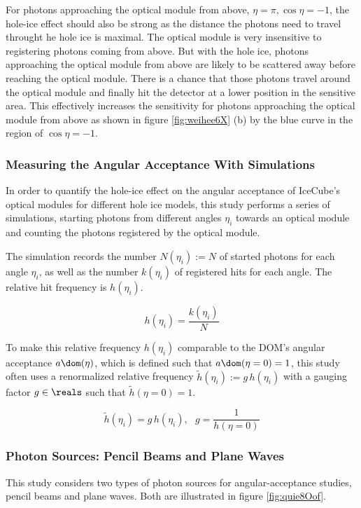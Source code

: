 For photons approaching the optical module from above, $\eta = \pi, \cos \eta = -1$, the hole-ice effect should also be strong as the distance the photons need to travel throught he hole ice is maximal. The optical module is very insensitive to registering photons coming from above. But with the hole ice, photons approaching the optical module from above are likely to be scattered away before reaching the optical module. There is a chance that those photons travel around the optical module and finally hit the detector at a lower position in the sensitive area. This effectively increases the sensitivity for photons approaching the optical module from above as shown in figure \ref{fig:weihee6X} (b) by the blue curve in the region of $\cos \eta = -1$.


\subsubsection{Measuring the Angular Acceptance With Simulations}
In order to quantify the hole-ice effect on the angular acceptance of IceCube's optical modules for different hole ice models, this study performs a series of simulations, starting photons from different angles $\eta_i$ towards an optical module and counting the photons registered by the optical module.

The simulation records the number $N(\eta_i):= N$ of started photons for each angle $\eta_i$, as well as the number $k(\eta_i)$ of registered hits for each angle. The relative hit frequency is $h(\eta_i)$.

\begin{equation}
  h(\eta_i) = \frac{k(\eta_i)}{N}
\end{equation}

To make this relative frequency $h(\eta_i)$ comparable to the DOM's angular acceptance $a\dom(\eta)$, which is defined such that $a\dom(\eta = 0) = 1$, this study often uses a renormalized relative frequency $\tilde{h}(\eta_i):=g\,h(\eta_i)$ with a gauging factor $g\in\reals$ such that $\tilde{h}(\eta = 0) = 1$.

\begin{equation}
  \tilde{h}(\eta_i) = g\,h(\eta_i), \ \ \
  g = \frac{1}{h(\eta = 0)}
  \label{eq:gauging_factor}
\end{equation}



\subsubsection{Photon Sources: Pencil Beams and Plane Waves}
This study considers two types of photon sources for angular-acceptance studies, pencil beams and plane waves. Both are illustrated in figure \ref{fig:quie8Oof}.

